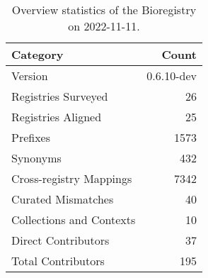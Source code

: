 \begin{table}
\centering
\caption{Overview statistics of the Bioregistry on 2022-11-11.}
\label{tab:bioregistry-summary}
\begin{tabular}{lr}
\toprule
                Category &      Count \\
\midrule
                 Version & 0.6.10-dev \\
     Registries Surveyed &         26 \\
      Registries Aligned &         25 \\
                Prefixes &       1573 \\
                Synonyms &        432 \\
 Cross-registry Mappings &       7342 \\
      Curated Mismatches &         40 \\
Collections and Contexts &         10 \\
     Direct Contributors &         37 \\
      Total Contributors &        195 \\
\bottomrule
\end{tabular}
\end{table}
